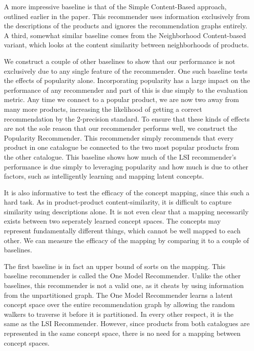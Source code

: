 \documentclass[11pt]{article}
\begin{document}
A more impressive baseline is that of the Simple Content-Based approach, 
outlined earlier in the paper. This recommender uses information exclusively
from the descriptions of the products and ignores the recommendation graphs 
entirely. A third, somewhat similar baseline comes from the Neighborhood 
Content-based variant, which looks at the content similarity between 
neighborhoods of products.

We construct a couple of other baselines to show that our performance is not
exclusively due to any single feature of the recommender. One such baseline
tests the effects of popularity alone. Incorporating popularity has a large 
impact on the performance of any recommender and part of this is due simply 
to the evaluation metric. Any time we connect to a popular product, we are 
now two away from many more products, increasing the likelihood of getting a
correct recommendation by the 2-precision standard. To ensure that these kinds 
of effects are not the sole reason that our recommender performs well, 
we construct the Popularity Recommender. This recommender simply recommends 
that every product in one catalogue be connected to the two most popular 
products from the other catalogue. This baseline shows how much of the LSI 
recommender's performance is due simply to leveraging popularity and how 
much is due to other factors, such as intelligently learning and mapping 
latent concepts.

It is also informative to test the efficacy of the concept mapping, since this
such a hard task. As in product-product content-similarity, it is difficult to
capture similarity using descriptions alone. It is not even clear that a mapping 
necessarily exists between two seperately learned concept spaces. The concepts 
may represent fundamentally different things, which cannot be well mapped to 
each other. We can measure the efficacy of the mapping by comparing it to a 
couple of baselines. 

The first baseline is in fact an upper bound of sorts on the mapping. This
baseline recommender is called the One Model Recommender. Unlike the other
baselines, this recommender is not a valid one, as it cheats by using
information from the unpartitioned graph. The One Model Recommender learns a
latent concept space over the entire recommendation graph by allowing the random
walkers to traverse it before it is partitioned. In every other respect, it is
the same as the LSI Recommender. However, since products from both catalogues
are represented in the same concept space, there is no need for a mapping
between concept spaces.
\end{document}

